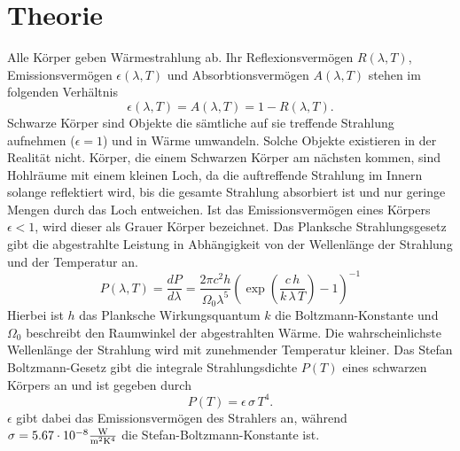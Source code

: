 \section{Theorie}
\label{sec:Theorie}

Alle Körper geben Wärmestrahlung ab. Ihr Reflexionsvermögen $R(\lambda,T)$, Emissionsvermögen $\epsilon(\lambda,T)$
und Absorbtionsvermögen $A(\lambda,T)$ stehen im folgenden Verhältnis
\begin{equation}
  \epsilon(\lambda,T)=A(\lambda,T)=1-R(\lambda,T).
  \label{eqn:verhaeltnisse}
\end{equation}
Schwarze Körper sind Objekte die sämtliche auf sie treffende Strahlung aufnehmen
\mbox{($\epsilon=1$)} und in Wärme umwandeln. Solche Objekte existieren in der Realität
nicht. Körper, die einem Schwarzen Körper am nächsten kommen, sind Hohlräume mit
einem kleinen Loch, da die auftreffende Strahlung im Innern solange reflektiert
wird, bis die gesamte Strahlung absorbiert ist und nur geringe Mengen durch das
Loch entweichen. Ist das Emissionsvermögen eines Körpers $\epsilon< 1$, wird
dieser als Grauer Körper bezeichnet. Das Planksche Strahlungsgesetz gibt die
abgestrahlte Leistung in Abhängigkeit von der Wellenlänge der Strahlung und der
Temperatur an.
\begin{equation}
  P(\lambda,T)=\frac{dP}{d\lambda}=\frac{2\pi c^2h}{\Omega_0\lambda^5}
  \left(\exp{ \left(\frac{c\,h}{k\,\lambda\,T}\right)} -1 \right)^{-1}
\end{equation}
Hierbei ist $h$ das Planksche Wirkungsquantum $k$ die Boltzmann-Konstante
und $\Omega_0$ beschreibt den Raumwinkel der abgestrahlten Wärme. Die wahrscheinlichste
Wellenlänge der Strahlung wird mit zunehmender Temperatur kleiner. Das
Stefan Boltzmann-Gesetz gibt die integrale Strahlungsdichte $P(T)$ eines schwarzen
Körpers an und ist gegeben durch
\begin{equation}
  P(T)=\epsilon \, \sigma \, T^4.
\end{equation}
$\epsilon$ gibt dabei das Emissionsvermögen des Strahlers an, während
$\sigma=5.67\cdot 10^{-8} \si{\frac{\watt}{\meter^2\kelvin^4}}$ die
Stefan-Boltzmann-Konstante ist.
\cite{sample}
